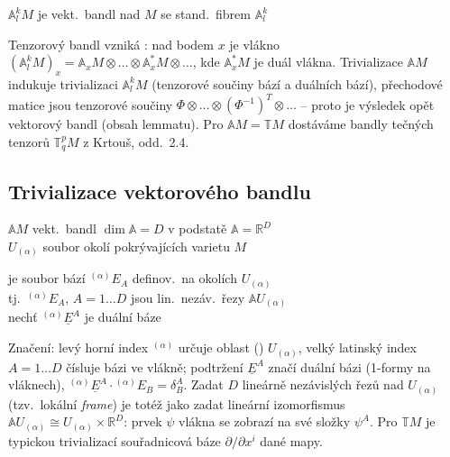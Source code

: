 \begin{veta}[Lemma]
$\mathbb{A}^k_lM$ je vekt.\ bandl nad $M$ se stand.\ fibrem $\mathbb{A}^k_l$
\end{veta}

\begin{vysvetleni}
Tenzorový bandl vzniká : nad bodem $x$ je vlákno $(\mathbb{A}^k_lM)_x = \mathbb{A}_xM\otimes\dots\otimes\mathbb{A}^*_xM\otimes\dots$,
kde $\mathbb{A}^*_xM$ je duál vlákna. Trivializace $\mathbb{A}M$ indukuje trivializaci $\mathbb{A}^k_lM$ (tenzorové součiny bází a duálních bází),
přechodové matice jsou tenzorové součiny $\Phi\otimes\dots\otimes(\Phi^{-1})^{T}\otimes\dots$ -- proto je výsledek opět vektorový bandl (obsah lemmatu).
Pro $\mathbb{A}M=\mathbb{T}M$ dostáváme bandly tečných tenzorů $\mathbb{T}^p_qM$ z Krtouš, odd.~2.4.
\end{vysvetleni}

\newpage
{}
\subsection{Trivializace vektorového bandlu}

\begin{definice}[trivializace]
$\mathbb{A}M$ vekt.\ bandl \hfill $\dim\mathbb{A} = D$ \quad v podstatě $\mathbb{A} = \mathbb{R}^D$ \\
$U_{(\alpha)}$ soubor okolí pokrývajících varietu $M$

 je soubor bází ${}^{(\alpha)}E_A$ definov.\ na okolích $U_{(\alpha)}$ \\
\quad tj.\ ${}^{(\alpha)}E_A$, $A = 1\dots D$ jsou lin.\ nezáv.\ řezy $\mathbb{A}U_{(\alpha)}$ \\
\quad nechť ${}^{(\alpha)}\underline{E}^A$ je duální báze
\end{definice}

\begin{vysvetleni}[Trivializace = lokální báze řezů]
Značení: levý horní index ${}^{(\alpha)}$ určuje oblast () $U_{(\alpha)}$, velký latinský index $A=1\dots D$ čísluje bázi ve vlákně;
podtržení $\underline{E}^A$ značí duální bázi (1-formy na vláknech), ${}^{(\alpha)}\underline{E}^A\cdot{}^{(\alpha)}E_B=\delta^A_B$.
Zadat $D$ lineárně nezávislých řezů nad $U_{(\alpha)}$ (tzv.\ lokální \emph{frame}) je totéž jako zadat lineární izomorfismus
$\mathbb{A}U_{(\alpha)}\cong U_{(\alpha)}\times\mathbb{R}^D$: prvek $\psi$ vlákna se zobrazí na své složky $\psi^A$.
Pro $\mathbb{T}M$ je typickou trivializací souřadnicová báze $\partial/\partial x^i$ dané mapy.
\end{vysvetleni}

